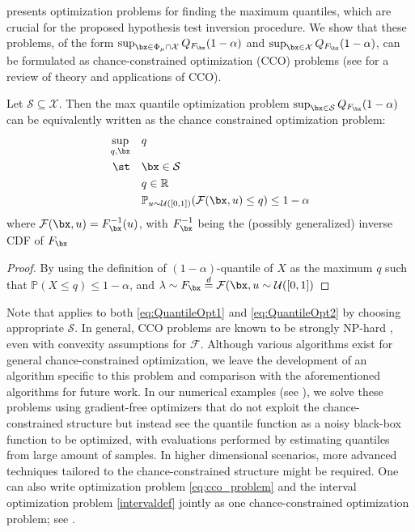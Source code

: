 \documentclass[11pt]{article}
\numberwithin{equation}{section}
\numberwithin{figure}{section}
\begin{document}
 presents optimization problems for finding the maximum quantiles, which are crucial for the proposed hypothesis test inversion procedure. 
We show that these problems, of the form $\sup_{\bx \in  \Phi_\mu \cap \mathcal{X}} Q_{F_\bx}(1-\alpha)$ and $\sup_{\bx \in \mathcal{X}} Q_{F_\bx}(1-\alpha)$, can be formulated as chance-constrained optimization (CCO) problems (see \cite{Geng2019} for a review of theory and applications of CCO).
\begin{lemma}\label{lemma:cco} 
Let $\mathcal S \subseteq \mathcal X$. 
Then the max quantile optimization problem $\sup_{\bx \in \mathcal{S}} Q_{F_\bx}(1-\alpha)$ can be equivalently written as the chance constrained optimization problem:
\begin{equation}\label{eq:cco_problem}
    \begin{aligned}
    \sup_{q, \bx} \quad & q \\
    \st \quad & \bx \in \mathcal{S} \\
    \quad & q \in \mathbb{R} \\
    \quad & \mathbb{P}_{u\sim \mathcal{U}([0,1])}(\mathcal{F}(\bx,u) \leq q) \leq 1-\alpha  \\ 
    \end{aligned}    
\end{equation}
where $\mathcal{F}(\bx, u) = F^{-1}_\bx(u)$, with $F^{-1}_\bx$ being the (possibly generalized) inverse CDF of $F_\bx$
\end{lemma}
\begin{proof}
    By using the definition of $(1-\alpha)$-quantile of $X$ as the maximum $q$ such that $\mathbb{P}(X\leq q) \leq 1-\alpha$, and $\lambda \sim F_\bx \overset{d}{=} \mathcal{F}(\bx, u \sim \mathcal{U}([0,1])$
\end{proof}

Note that  applies to both \eqref{eq:QuantileOpt1} and \eqref{eq:QuantileOpt2} by choosing appropriate $\mathcal{S}$. In general, CCO problems are known to be strongly NP-hard \cite{Geng2019}, even with convexity assumptions for $\mathcal{F}$. 
Although various algorithms exist for general chance-constrained optimization, we leave the development of an algorithm specific to this problem and comparison with the aforementioned algorithms for future work. 
In our numerical examples (see ), we solve these problems using gradient-free optimizers that do not exploit the chance-constrained structure but instead see the quantile function as a noisy black-box function to be optimized, with evaluations performed by estimating quantiles from large amount of samples. 
In higher dimensional scenarios, more advanced techniques tailored to the chance-constrained structure might be required. 
One can also write optimization problem \eqref{eq:cco_problem} and the interval optimization problem \eqref{intervaldef} jointly as one chance-constrained optimization problem; see .
\end{document}
